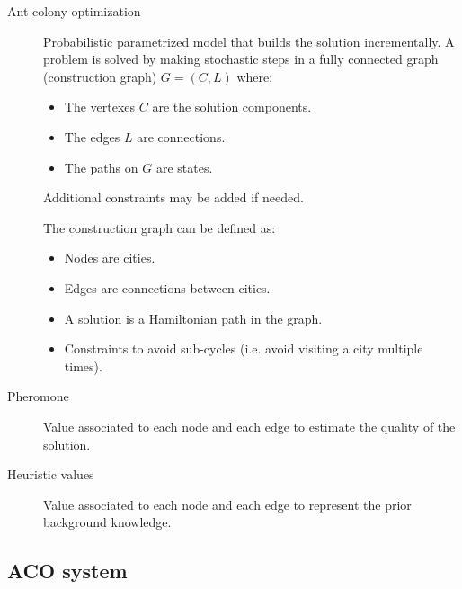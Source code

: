 \begin{description}
    \item[Ant colony optimization] 
        Probabilistic parametrized model that builds the solution incrementally.
        A problem is solved by making stochastic steps in a fully connected graph (construction graph) $G=(C, L)$ where:
        \begin{itemize}
            \item The vertexes $C$ are the solution components.
            \item The edges $L$ are connections.
            \item The paths on $G$ are states.
        \end{itemize}
        Additional constraints may be added if needed.

        \begin{example}
            The construction graph can be defined as:
            \begin{itemize}
                \item Nodes are cities.
                \item Edges are connections between cities.
                \item A solution is a Hamiltonian path in the graph.
                \item Constraints to avoid sub-cycles (i.e. avoid visiting a city multiple times).
            \end{itemize}            
        \end{example}

    \item[Pheromone] 
        Value associated to each node and each edge to estimate the quality of the solution.

    \item[Heuristic values] 
        Value associated to each node and each edge to represent the prior background knowledge.
\end{description}


\subsection{ACO system} 


